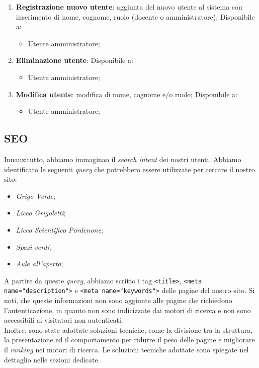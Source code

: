 \begin{enumerate}
    \item \textbf{Registrazione nuovo utente}: aggiunta del nuovo utente al
    sistema con inserimento di nome, cognome, ruolo (docente o amministratore);
    Disponibile a:
        \begin{itemize}
            \item Utente amministratore;
        \end{itemize}

    \item \textbf{Eliminazione utente}: Disponibile a:
        \begin{itemize}
            \item Utente amministratore;
        \end{itemize}

    \item \textbf{Modifica utente}: modifica di nome, cognome e/o ruolo;
    Disponibile a:
        \begin{itemize}
            \item Utente amministratore;
        \end{itemize}
\end{enumerate}

\subsection{SEO}

Innanzitutto, abbiamo immaginao il \textit{search intent} dei nostri utenti. 
Abbiamo identificato le seguenti \textit{query} che potrebbero essere 
utilizzate per cercare il nostro sito:
\begin{itemize}
	\item \textit{Grigo Verde};
	\item \textit{Liceo Grigoletti};
	\item \textit{Liceo Scientifico Pordenone};
	\item \textit{Spazi verdi};
	\item \textit{Aule all'aperto};
\end{itemize}

A partire da queste \textit{query}, abbiamo scritto i tag \texttt{<title>},
\texttt{<meta name="description">} e \texttt{<meta name="keywords">} delle
pagine del nostro sito. Si noti, che queste informazioni non sono aggiunte alle
pagine che richiedono l'autenticazione, in quanto non sono indicizzate dai
motori di ricerca e non sono accessibili ai visitatori non autenticati.\\
Inoltre, sono state adottate soluzioni tecniche, come la
divisione tra la struttura, la presentazione ed il comportamento per ridurre il
peso delle pagine e migliorare il \textit{ranking} nei motori di ricerca. Le
soluzioni tecniche adottate sono spiegate nel dettaglio nelle sezioni dedicate.
